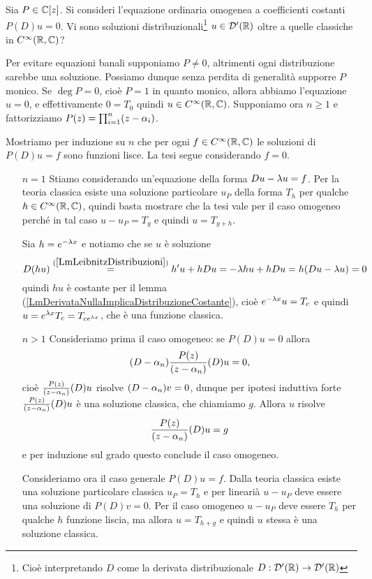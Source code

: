 \documentclass[a4paper]{article}
\begin{document}
\begin{exercise}
Sia $P\in \mathbb{C}[z]$. Si consideri l'equazione ordinaria omogenea a coefficienti costanti $P(D)u=0$. Vi sono soluzioni distribuzionali\footnote{Cio\`e interpretando $D$ come la derivata distribuzionale $D:\mathcal{D}'(\mathbb{R})\to\mathcal{D}'(\mathbb{R})$} $u\in \mathcal{D}'(\mathbb{R})$ oltre a quelle classiche in $C^\infty(\mathbb{R},\mathbb{C})$?
\end{exercise}
\begin{solution}
Per evitare equazioni banali supponiamo $P\neq 0$, altrimenti ogni distribuzione sarebbe una soluzione. Possiamo dunque senza perdita di generalit\`a supporre $P$ monico. Se $\deg P=0$, cio\`e $P=1$ in quanto monico, allora abbiamo l'equazione $u=0$, e effettivamente $0=T_0$ quindi $u\in C^\infty(\mathbb{R},\mathbb{C})$. Supponiamo ora $n\geq 1$ e fattorizziamo $P(z)=\prod_{i=1}^n(z-\alpha_i)$.

Mostriamo per induzione su $n$ che per ogni $f\in C^\infty(\mathbb{R},\mathbb{C})$ le soluzioni di $P(D)u=f$ sono funzioni lisce. La tesi segue considerando $f=0$.
\setlength{\leftmargini}{0cm}
\begin{itemize}
\item[$\boxed{n=1}$] Stiamo considerando un'equazione della forma $Du-\lambda u=f$. Per la teoria classica esiste una soluzione particolare $u_P$ della forma $T_h$ per qualche $h\in C^\infty(\mathbb{R},\mathbb{C})$, quindi basta mostrare che la tesi vale per il caso omogeneo perch\'e in tal caso $u-u_P=T_g$ e quindi $u=T_{g+h}$.

Sia $h=e^{-\lambda x}$ e notiamo che se $u$ \`e soluzione
\[D(hu)\overset{(\ref{LmLeibnitzDistribuzioni})}=h'u+hDu=-\lambda hu+hDu=h(Du-\lambda u)=0\]
quindi $hu$ \`e costante per il lemma (\ref{LmDerivataNullaImplicaDistribuzioneCostante}), cio\`e $e^{-\lambda x}u=T_c$ e quindi $u=e^{\lambda x}T_c=T_{ce^{\lambda x}}$, che \`e una funzione classica.
\item[$\boxed{n>1}$] Consideriamo prima il caso omogeneo: se $P(D)u=0$ allora 
\[(D-\alpha_n)\frac{P(z)}{(z-\alpha_n)}(D)u=0,\] 
cio\`e $\frac{P(z)}{(z-\alpha_n)}(D)u$ risolve $(D-\alpha_n)v=0$, dunque per ipotesi induttiva forte $\frac{P(z)}{(z-\alpha_n)}(D)u$ \`e una soluzione classica, che chiamiamo $g$. Allora $u$ risolve
\[\frac{P(z)}{(z-\alpha_n)}(D)u=g\]
e per induzione sul grado questo conclude il caso omogeneo.

Consideriamo ora il caso generale $P(D)u=f$. Dalla teoria classica esiste una soluzione particolare classica $u_P=T_h$ e per lineari\`a $u-u_P$ deve essere una soluzione di $P(D)v=0$. Per il caso omogeneo $u-u_P$ deve essere $T_h$ per qualche $h$ funzione liscia, ma allora $u=T_{h+g}$ e quindi $u$ stessa \`e una soluzione classica.
\end{itemize}
\setlength{\leftmargini}{0.5cm}
\end{solution}
\end{document}
